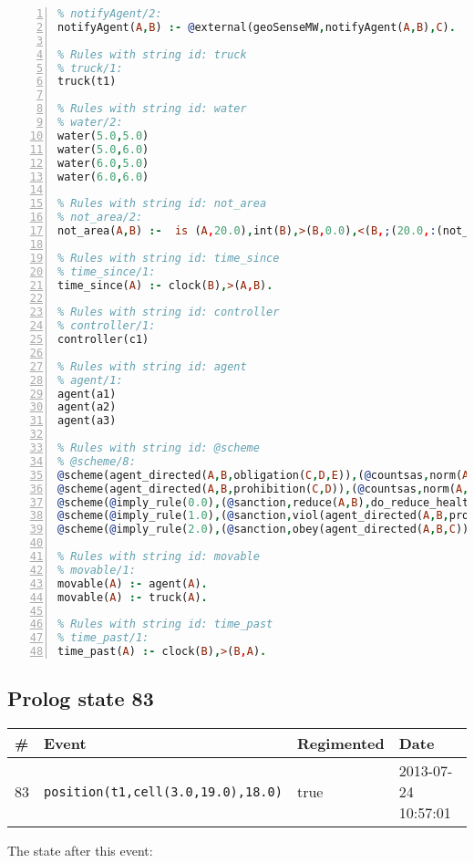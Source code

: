 \documentclass[11pt]{article}\usepackage[utf8]{inputenc}\usepackage{geometry}
\begin{document}
\begin{lstlisting}[language=Prolog, numbers=left]
% Rules with string id: notifyAgent
% notifyAgent/2:
notifyAgent(A,B) :- @external(geoSenseMW,notifyAgent(A,B),C).

% Rules with string id: truck
% truck/1:
truck(t1)

% Rules with string id: water
% water/2:
water(5.0,5.0)
water(5.0,6.0)
water(6.0,5.0)
water(6.0,6.0)

% Rules with string id: not_area
% not_area/2:
not_area(A,B) :-  is (A,20.0),int(B),>(B,0.0),<(B,;(20.0,:(not_area(A,B), is (-(B),20.0)))),int(A),>(A,0.0),<(A,;(20.0,:(area(A,B),-(int(A))))),int(B),>(A,0.0),>(B,0.0),<(A,21.0),<(B,21.0).

% Rules with string id: time_since
% time_since/1:
time_since(A) :- clock(B),>(A,B).

% Rules with string id: controller
% controller/1:
controller(c1)

% Rules with string id: agent
% agent/1:
agent(a1)
agent(a2)
agent(a3)

% Rules with string id: @scheme
% @scheme/8:
@scheme(agent_directed(A,B,obligation(C,D,E)),(@countsas,norm(A,B,F,obligation(C,D,E)),F),false,(listTrue(C)),(time_past(D)),false,[plus(viol(agent_directed(A,B,obligation(C,D,E))))|[]],[plus(obey(agent_directed(A,B,obligation(C,D,E))))|[]])
@scheme(agent_directed(A,B,prohibition(C,D)),(@countsas,norm(A,B,E,prohibition(C,D)),E),(listTrue(C)),false,(false),false,[plus(viol(agent_directed(A,B,prohibition(C,D))))|[]],[plus(obey(agent_directed(A,B,prohibition(C,D))))|[]])
@scheme(@imply_rule(0.0),(@sanction,reduce(A,B),do_reduce_health(A,B),notifyAgent(A,changed(status))),true,false,false,false,[min(reduce(A,B))|[]],[])
@scheme(@imply_rule(1.0),(@sanction,viol(agent_directed(A,B,prohibition(C,D))),do_sanction(D)),true,false,false,false,[min(viol(agent_directed(A,B,prohibition(C,D))))|[]],[])
@scheme(@imply_rule(2.0),(@sanction,obey(agent_directed(A,B,C))),true,false,false,false,[min(obey(agent_directed(A,B,C)))|[]],[])

% Rules with string id: movable
% movable/1:
movable(A) :- agent(A).
movable(A) :- truck(A).

% Rules with string id: time_past
% time_past/1:
time_past(A) :- clock(B),>(B,A).

\end{lstlisting}
\clearpage 
\subsection{Prolog state 83}
\begin{table}[ht]
\centering 
\begin{tabular}{l l l l} 
\textbf{\#} & \textbf{Event} & \textbf{Regimented} & \textbf{Date} \\ [0.5ex] 
\hline
83&\texttt{position(t1,cell(3.0,19.0),18.0)}&true&2013-07-24 10:57:01\\ [1ex] \hline\end{tabular}
\end{table}
The state after this event:
\end{document}
